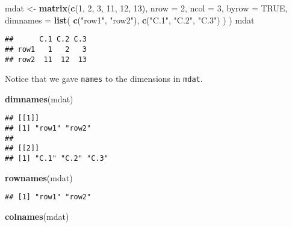\documentclass[
]{book}
\newenvironment{Shaded}{\begin{snugshade}}{\end{snugshade}}
\newcommand{\DataTypeTok}[1]{\textcolor[rgb]{0.13,0.29,0.53}{#1}}
\newcommand{\DecValTok}[1]{\textcolor[rgb]{0.00,0.00,0.81}{#1}}
\newcommand{\KeywordTok}[1]{\textcolor[rgb]{0.13,0.29,0.53}{\textbf{#1}}}
\newcommand{\NormalTok}[1]{#1}
\newcommand{\OtherTok}[1]{\textcolor[rgb]{0.56,0.35,0.01}{#1}}
\newcommand{\StringTok}[1]{\textcolor[rgb]{0.31,0.60,0.02}{#1}}
\begin{document}
\begin{Shaded}
\begin{Highlighting}[]
\NormalTok{mdat \textless{}{-}}\StringTok{ }\KeywordTok{matrix}\NormalTok{(}\KeywordTok{c}\NormalTok{(}\DecValTok{1}\NormalTok{, }\DecValTok{2}\NormalTok{, }\DecValTok{3}\NormalTok{, }\DecValTok{11}\NormalTok{, }\DecValTok{12}\NormalTok{, }\DecValTok{13}\NormalTok{),}
  \DataTypeTok{nrow =} \DecValTok{2}\NormalTok{,}
  \DataTypeTok{ncol =} \DecValTok{3}\NormalTok{,}
  \DataTypeTok{byrow =} \OtherTok{TRUE}\NormalTok{,}
  \DataTypeTok{dimnames =} \KeywordTok{list}\NormalTok{(}
    \KeywordTok{c}\NormalTok{(}\StringTok{"row1"}\NormalTok{, }\StringTok{"row2"}\NormalTok{),}
    \KeywordTok{c}\NormalTok{(}\StringTok{"C.1"}\NormalTok{, }\StringTok{"C.2"}\NormalTok{, }\StringTok{"C.3"}\NormalTok{)}
\NormalTok{  )}
\NormalTok{)}
\NormalTok{mdat}
\end{Highlighting}
\end{Shaded}

\begin{verbatim}
##      C.1 C.2 C.3
## row1   1   2   3
## row2  11  12  13
\end{verbatim}

Notice that we gave \texttt{names} to the dimensions in \texttt{mdat}.

\begin{Shaded}
\begin{Highlighting}[]
\KeywordTok{dimnames}\NormalTok{(mdat)}
\end{Highlighting}
\end{Shaded}

\begin{verbatim}
## [[1]]
## [1] "row1" "row2"
## 
## [[2]]
## [1] "C.1" "C.2" "C.3"
\end{verbatim}

\begin{Shaded}
\begin{Highlighting}[]
\KeywordTok{rownames}\NormalTok{(mdat)}
\end{Highlighting}
\end{Shaded}

\begin{verbatim}
## [1] "row1" "row2"
\end{verbatim}

\begin{Shaded}
\begin{Highlighting}[]
\KeywordTok{colnames}\NormalTok{(mdat)}
\end{Highlighting}
\end{Shaded}
\end{document}
